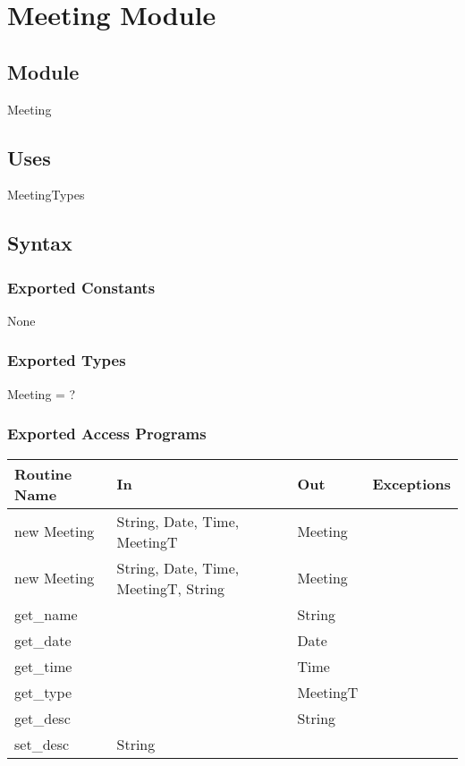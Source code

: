 \documentclass[12pt, titlepage]{article}
\begin{document}
\newpage

\section* {Meeting Module}

\subsection*{Module}
Meeting

\subsection* {Uses}
MeetingTypes

\subsection* {Syntax}
\subsubsection* {Exported Constants}
None

\subsubsection* {Exported Types}
Meeting = ?

\subsubsection* {Exported Access Programs}
\begin{tabular}{|l|l|l|l|}
    \hline
    \textbf{Routine Name} & \textbf{In} & \textbf{Out} & \textbf{Exceptions} \\
    \hline
    new Meeting & String, Date, Time, MeetingT & Meeting & \\
    \hline
    new Meeting & String, Date, Time, MeetingT, String & Meeting & \\
    \hline
    get\_name & & String &\\
    \hline
    get\_date & & Date &\\
    \hline
    get\_time & & Time &\\
    \hline
    get\_type & & MeetingT &\\
    \hline
    get\_desc & & String &\\
    \hline
    set\_desc & String & & \\
    \hline
\end{tabular}
\end{document}

